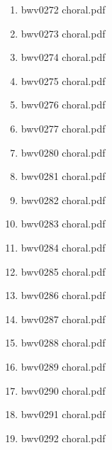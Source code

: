\documentclass[11pt]{article}
\begin{document}
\begin{enumerate}
\begin{enumerate}
\begin{enumerate}
\begin{enumerate}
\item bwv0272 choral.pdf
\label{sec-1-1-1-1-44-6-7-2-4-23}

\item bwv0273 choral.pdf
\label{sec-1-1-1-1-44-6-7-2-4-24}

\item bwv0274 choral.pdf
\label{sec-1-1-1-1-44-6-7-2-4-25}

\item bwv0275 choral.pdf
\label{sec-1-1-1-1-44-6-7-2-4-26}

\item bwv0276 choral.pdf
\label{sec-1-1-1-1-44-6-7-2-4-27}

\item bwv0277 choral.pdf
\label{sec-1-1-1-1-44-6-7-2-4-28}

\item bwv0280 choral.pdf
\label{sec-1-1-1-1-44-6-7-2-4-29}

\item bwv0281 choral.pdf
\label{sec-1-1-1-1-44-6-7-2-4-30}

\item bwv0282 choral.pdf
\label{sec-1-1-1-1-44-6-7-2-4-31}

\item bwv0283 choral.pdf
\label{sec-1-1-1-1-44-6-7-2-4-32}

\item bwv0284 choral.pdf
\label{sec-1-1-1-1-44-6-7-2-4-33}

\item bwv0285 choral.pdf
\label{sec-1-1-1-1-44-6-7-2-4-34}

\item bwv0286 choral.pdf
\label{sec-1-1-1-1-44-6-7-2-4-35}

\item bwv0287 choral.pdf
\label{sec-1-1-1-1-44-6-7-2-4-36}

\item bwv0288 choral.pdf
\label{sec-1-1-1-1-44-6-7-2-4-37}

\item bwv0289 choral.pdf
\label{sec-1-1-1-1-44-6-7-2-4-38}

\item bwv0290 choral.pdf
\label{sec-1-1-1-1-44-6-7-2-4-39}

\item bwv0291 choral.pdf
\label{sec-1-1-1-1-44-6-7-2-4-40}

\item bwv0292 choral.pdf
\label{sec-1-1-1-1-44-6-7-2-4-41}


\end{enumerate}
\end{enumerate}
\end{enumerate}
\end{enumerate}
\end{document}
